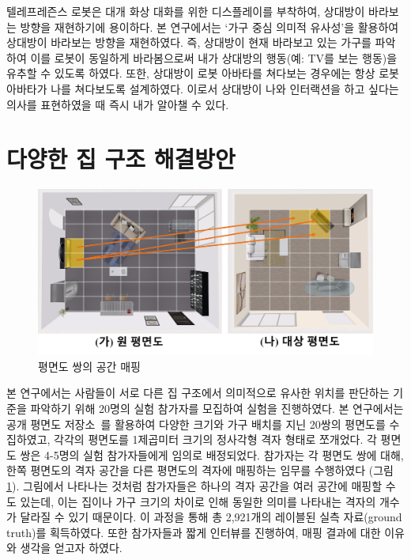 텔레프레즌스 로봇은 대개 화상 대화를 위한 디스플레이를 부착하여, 상대방이 바라보는 방향을 재현하기에 용이하다. 본 연구에서는 `가구 중심 의미적 유사성'을 활용하여 상대방이 바라보는 방향을 재현하였다. 즉, 상대방이 현재 바라보고 있는 가구를 파악하여 이를 로봇이 동일하게 바라봄으로써 내가 상대방의 행동(예: TV를 보는 행동)을 유추할 수 있도록 하였다. 또한, 상대방이 로봇 아바타를 쳐다보는 경우에는 항상 로봇 아바타가 나를 쳐다보도록 설계하였다. 이로서 상대방이 나와 인터랙션을 하고 싶다는 의사를 표현하였을 때 즉시 내가 알아챌 수 있다.

\section{다양한 집 구조 해결방안}
\label{subsec:home_heterogeneity}


\begin{figure}
\centering
\includegraphics[width=15cm]{images/mapping.pdf}
\caption{평면도 쌍의 공간 매핑}
\label{fig:mapping}
\end{figure}

본 연구에서는 사람들이 서로 다른 집 구조에서 의미적으로 유사한 위치를 판단하는 기준을 파악하기 위해 20명의 실험 참가자를 모집하여 실험을 진행하였다. 본 연구에서는 공개 평면도 저장소~\cite{floorplanner}를 활용하여 다양한 크기와 가구 배치를 지닌 20쌍의 평면도를 수집하였고, 각각의 평면도를 1제곱미터 크기의 정사각형 격자 형태로 쪼개었다. 각 평면도 쌍은 4-5명의 실험 참가자들에게 임의로 배정되었다. 참가자는 각 평면도 쌍에 대해, 한쪽 평면도의 격자 공간을 다른 평면도의 격자에 매핑하는 임무를 수행하였다 (그림 \ref{fig:mapping}). 그림에서 나타나는 것처럼 참가자들은 하나의 격자 공간을 여러 공간에 매핑할 수도 있는데, 이는 집이나 가구 크기의 차이로 인해 동일한 의미를 나타내는 격자의 개수가 달라질 수 있기 때문이다. 이 과정을 통해 총 2,921개의 레이블된 실측 자료(ground truth)를 획득하였다. 또한 참가자들과 짧게 인터뷰를 진행하여, 매핑 결과에 대한 이유와 생각을 얻고자 하였다.

